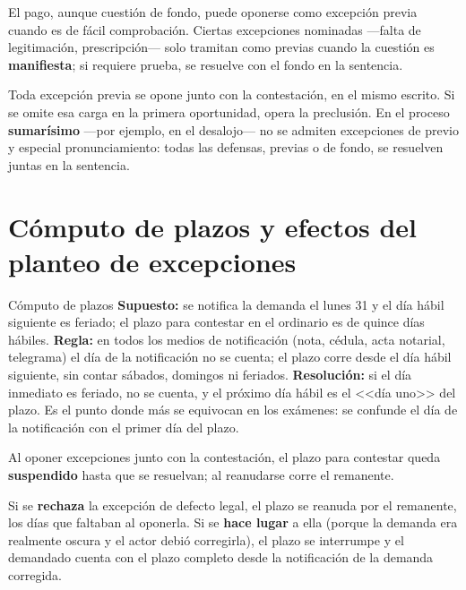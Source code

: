 \documentclass[12pt,oneside]{book}
\begin{document}
El pago, aunque cuestión de fondo, puede oponerse como excepción previa cuando es de fácil comprobación. Ciertas excepciones nominadas ---falta de legitimación, prescripción--- solo tramitan como previas cuando la cuestión es \textbf{manifiesta}; si requiere prueba, se resuelve con el fondo en la sentencia.

\begin{important}
Toda excepción previa se opone junto con la contestación, en el mismo escrito. Si se omite esa carga en la primera oportunidad, opera la preclusión. En el proceso \textbf{sumarísimo} ---por ejemplo, en el desalojo--- no se admiten excepciones de previo y especial pronunciamiento: todas las defensas, previas o de fondo, se resuelven juntas en la sentencia.
\end{important}

\section{Cómputo de plazos y efectos del planteo de excepciones}

\begin{exercise}{Cómputo de plazos}
\textbf{Supuesto:} se notifica la demanda el lunes 31 y el día hábil siguiente es feriado; el plazo para contestar en el ordinario es de quince días hábiles. \textbf{Regla:} en todos los medios de notificación (nota, cédula, acta notarial, telegrama) el día de la notificación no se cuenta; el plazo corre desde el día hábil siguiente, sin contar sábados, domingos ni feriados. \textbf{Resolución:} si el día inmediato es feriado, no se cuenta, y el próximo día hábil es el <<día uno>> del plazo. Es el punto donde más se equivocan en los exámenes: se confunde el día de la notificación con el primer día del plazo.
\end{exercise}

Al oponer excepciones junto con la contestación, el plazo para contestar queda \textbf{suspendido} hasta que se resuelvan; al reanudarse corre el remanente.

\begin{important}
Si se \textbf{rechaza} la excepción de defecto legal, el plazo se reanuda por el remanente, los días que faltaban al oponerla. Si se \textbf{hace lugar} a ella (porque la demanda era realmente oscura y el actor debió corregirla), el plazo se interrumpe y el demandado cuenta con el plazo completo desde la notificación de la demanda corregida.
\end{important}
\end{document}
